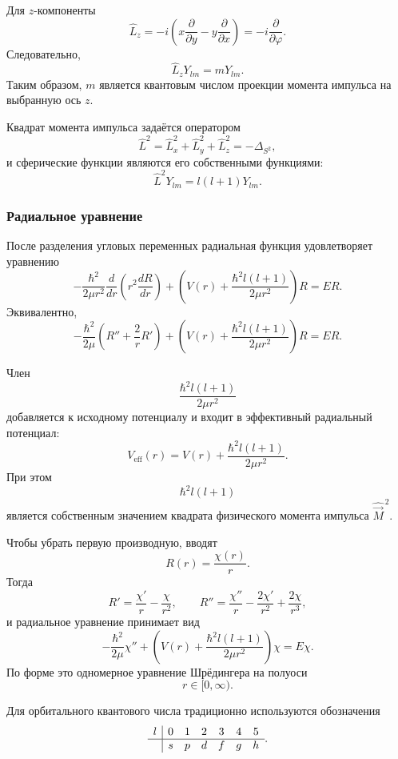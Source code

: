 \documentclass[12pt,a4paper]{article}
\begin{document}
Для $z$-компоненты
\[
    \hat L_z
    =
    -i
    \left(
        x\frac{\partial}{\partial y}
        -
        y\frac{\partial}{\partial x}
    \right)
    =
    -i\frac{\partial}{\partial\varphi}.
\]
Следовательно,
\[
    \boxed{
        \hat L_zY_{lm}=mY_{lm}
    }.
\]
Таким образом, $m$ является квантовым числом проекции момента импульса
на выбранную ось $z$.

Квадрат момента импульса задаётся оператором
\[
    \hat L^2
    =
    \hat L_x^2+\hat L_y^2+\hat L_z^2
    =
    -\Delta_{S^2},
\]
и сферические функции являются его собственными функциями:
\[
    \boxed{
        \hat L^2Y_{lm}
        =
        l(l+1)Y_{lm}
    }.
\]

\subsubsection{Радиальное уравнение}

После разделения угловых переменных радиальная функция удовлетворяет
уравнению
\[
    \boxed{
    -\frac{\hbar^2}{2\mu r^2}
    \frac{d}{dr}
    \left(
        r^2\frac{dR}{dr}
    \right)
    +
    \left(
        V(r)+
        \frac{\hbar^2l(l+1)}{2\mu r^2}
    \right)R
    =
    ER
    }.
\]
Эквивалентно,
\[
    -\frac{\hbar^2}{2\mu}
    \left(
        R''+\frac{2}{r}R'
    \right)
    +
    \left(
        V(r)+
        \frac{\hbar^2l(l+1)}{2\mu r^2}
    \right)R
    =
    ER.
\]

Член
\[
    \frac{\hbar^2l(l+1)}{2\mu r^2}
\]
добавляется к исходному потенциалу и входит в эффективный радиальный
потенциал:
\[
    \boxed{
        V_{\mathrm{eff}}(r)
        =
        V(r)+
        \frac{\hbar^2l(l+1)}{2\mu r^2}
    }.
\]
При этом
\[
    \hbar^2l(l+1)
\]
является собственным значением квадрата физического момента импульса
$\hat{\vec M}^{\,2}$.

Чтобы убрать первую производную, вводят
\[
    R(r)=\frac{\chi(r)}{r}.
\]
Тогда
\[
    R'
    =
    \frac{\chi'}{r}
    -
    \frac{\chi}{r^2},
    \qquad
    R''
    =
    \frac{\chi''}{r}
    -
    \frac{2\chi'}{r^2}
    +
    \frac{2\chi}{r^3},
\]
и радиальное уравнение принимает вид
\[
    \boxed{
    -\frac{\hbar^2}{2\mu}\chi''
    +
    \left(
        V(r)+
        \frac{\hbar^2l(l+1)}{2\mu r^2}
    \right)\chi
    =
    E\chi
    }.
\]
По форме это одномерное уравнение Шрёдингера на полуоси
\[
    r\in[0,\infty).
\]

Для орбитального квантового числа традиционно используются обозначения
\[
    \begin{array}{c|cccccc}
        l & 0 & 1 & 2 & 3 & 4 & 5 \\ \hline
          & s & p & d & f & g & h
    \end{array}.
\]
\end{document}
